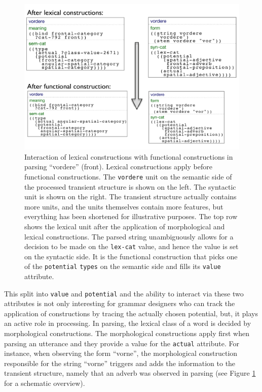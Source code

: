 \begin{figure}
\begin{center}
\includegraphics[width=1.0\columnwidth]{figs/parsing-vordere}
\end{center}
\caption[Interaction of lexical constructions
with functional constructions -- semantics]{
Interaction of lexical constructions 
with functional constructions in parsing ``vordere'' (front). 
Lexical constructions apply before functional constructions.
The {\footnotesize\tt vordere} unit on the semantic side of the 
processed transient structure is shown on the left.
The syntactic unit is shown on the right. The transient 
structure actually contains more units, and the units themselves
contain more features, but everything has been shortened 
for illustrative purposes. The top row shows the lexical unit after the 
application of morphological and lexical constructions. The 
parsed string unambiguously allows for a decision to be 
made on the {\footnotesize\tt lex-cat} value, and 
hence the value is set on the syntactic side. It is the functional 
construction that picks one of the {\footnotesize\tt potential} {\footnotesize\tt types} 
on the semantic side and 
fills its {\footnotesize\tt value} attribute.}
\label{f:parsing-vordere}
\end{figure}

This split into {\footnotesize\tt value} and {\footnotesize\tt potential} and 
the ability to interact via these two attributes is not only interesting
for grammar designers who can track the application
of constructions by tracing the actually chosen potential, but, it plays 
an active role in processing. In parsing,
the lexical class of a word is decided by morphological 
constructions. The morphological constructions apply first when 
parsing an utterance and they provide a value for the
{\footnotesize\tt actual} attribute. For instance, when observing the form 
``vorne'', the morphological construction responsible for the
string ``vorne'' triggers and adds the information to the transient 
structure, namely that an adverb was observed in parsing (see 
Figure \ref{f:parsing-vordere} for a schematic overview).

